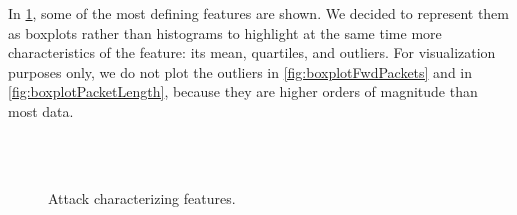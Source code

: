 \documentclass[acmlarge,nonacm]{acmart}
\begin{document}
In \cref{fig:boxplotNewFeatures}, some of the most defining features are shown. We decided to represent them as boxplots rather than histograms to highlight at the same time more characteristics of the feature: its mean, quartiles, and outliers. For visualization purposes only, we do not plot the outliers in \cref{fig:boxplotFwdPackets} and in \cref{fig:boxplotPacketLength}, because they are higher orders of magnitude than most data. 

\begin{figure}
	\centering
     \quad
	 \\
     \quad
	 \\
  	\caption{Attack characterizing features.} 
    \label{fig:boxplotNewFeatures}
\end{figure}
\end{document}
